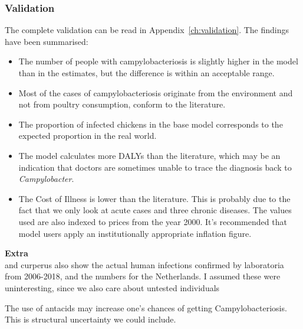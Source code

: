 
\subsubsection{Validation}    


The complete validation can be read in Appendix~\ref{ch:validation}. The findings have been summarised:

\begin{itemize}
    \item The number of people with campylobacteriosis is slightly higher in the model than in the estimates, but the difference is within an acceptable range.
    \item Most of the cases of campylobacteriosis originate from the environment and not from poultry consumption, conform to the literature.
    \item The proportion of infected chickens in the base model corresponds to the expected proportion in the real world.
    \item The model calculates more DALYs than the literature, which may be an indication that doctors are sometimes unable to trace the diagnosis back to \textit{Campylobacter}.
    \item The Cost of Illness is lower than the literature. This is probably due to the fact that we only look at acute cases and three chronic diseases. The values used are also indexed to prices from the year 2000. It's recommended that model users apply an institutionally appropriate inflation figure.
\end{itemize}

\iffalse
\textbf{Extra}\\
\textcite{vlaanderen_staat_2019} and curperus also show the actual human infections confirmed by laboratoria from 2006-2018, and the numbers for the Netherlands. I assumed these were uninteresting, since we also care about untested individuals

The use of antacids may increase one's chances of getting Campylobacteriosis. This is structural uncertainty we could include.

